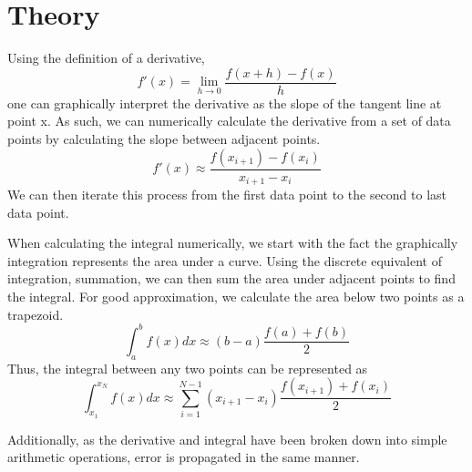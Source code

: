 \documentclass{article}
\begin{document}
\section{Theory}
Using the definition of a derivative,
\begin{equation} f'(x) = \lim_{h \to 0} \frac{f(x+h)-f(x)}{h} \end{equation}
one can graphically interpret the derivative as the slope of the tangent line at point x. As such, we can numerically calculate the derivative from a set of data points by calculating the slope between adjacent points.
\begin{equation} f'(x) \approx \frac{f(x_{i+1})-f(x_i)}{x_{i+1}-x_{i}}  \end{equation}
We can then iterate this process from the first data point to the second to last data point. 

When calculating the integral numerically, we start with the fact the graphically integration represents the area under a curve. Using the discrete equivalent of integration, summation, we can then sum the area under adjacent points to find the integral. For good approximation, we calculate the area below two points as a trapezoid.
\begin{equation} \int^b_a f(x)dx \approx (b-a) \frac{f(a)+f(b)}{2}  \end{equation}
Thus, the integral between any two points can be represented as
\begin{equation} \int_{x_1}^{x_N} f(x)dx \approx \sum_{i=1}^{N-1} (x_{i+1}-x_i) \frac{f(x_{i+1})+f(x_i)}{2}  \end{equation}

Additionally, as the derivative and integral have been broken down into simple arithmetic operations, error is propagated in the same manner.
\end{document}
